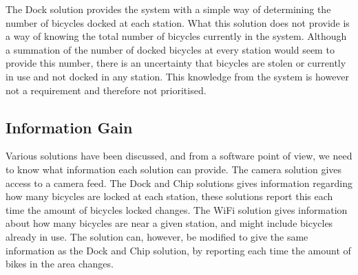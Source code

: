 The Dock solution provides the system with a simple way of determining the number of bicycles docked at each station. What this solution does not provide is a way of knowing the total number of bicycles currently in the system. Although a summation of the number of docked bicycles at every station would seem to provide this number, there is an uncertainty that bicycles are stolen or currently in use and not docked in any station. This knowledge from the system is however not a requirement and therefore not prioritised.

\subsection{Information Gain}
Various solutions have been discussed, and from a software point of view, we need to know what information each solution can provide.
The camera solution gives access to a camera feed.
The Dock and Chip solutions gives information regarding how many bicycles are locked at each station, these solutions report this each time the amount of bicycles locked changes.
The WiFi solution gives information about how many bicycles are near a given station, and might include bicycles already in use.
The solution can, however, be modified to give the same information as the Dock and Chip solution, by reporting each time the amount of bikes in the area changes.

